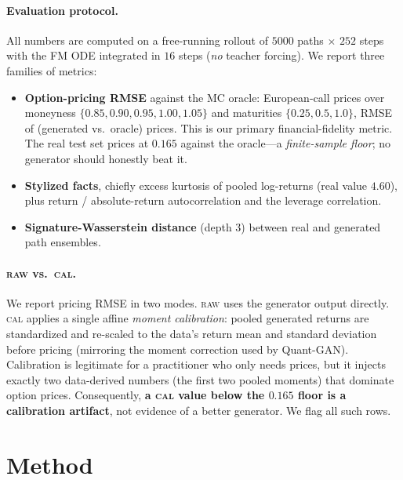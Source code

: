 \documentclass[11pt]{article}
\newcommand{\raw}{\textsc{raw}}
\renewcommand{\cal}{\textsc{cal}}
\begin{document}
\paragraph{Evaluation protocol.}
All numbers are computed on a free-running rollout of $5000$ paths
$\times$ $252$ steps with the FM ODE integrated in $16$ steps (\emph{no} teacher
forcing). We report three families of metrics:
\begin{itemize}\itemsep2pt
\item \textbf{Option-pricing RMSE} against the MC oracle: European-call prices over
moneyness $\{0.85,0.90,0.95,1.00,1.05\}$ and maturities $\{0.25,0.5,1.0\}$,
RMSE of (generated vs.\ oracle) prices. This is our primary financial-fidelity
metric. The real test set prices at $\mathbf{0.165}$ against the oracle---a
\emph{finite-sample floor}; no generator should honestly beat it.
\item \textbf{Stylized facts}, chiefly excess kurtosis of pooled log-returns
(real value $\mathbf{4.60}$), plus return / absolute-return autocorrelation and the
leverage correlation.
\item \textbf{Signature-Wasserstein distance} (depth 3) between real and generated
path ensembles.
\end{itemize}

\paragraph{\raw{} vs.\ \cal{}.}
We report pricing RMSE in two modes. \raw{} uses the generator output directly.
\cal{} applies a single affine \emph{moment calibration}: pooled generated returns
are standardized and re-scaled to the data's return mean and standard deviation
before pricing (mirroring the moment correction used by Quant-GAN). Calibration is
legitimate for a practitioner who only needs prices, but it injects exactly two
data-derived numbers (the first two pooled moments) that dominate option prices.
Consequently, \textbf{a \cal{} value below the $0.165$ floor is a calibration
artifact}, not evidence of a better generator. We flag all such rows.

\section{Method}
\label{sec:method}
\end{document}
